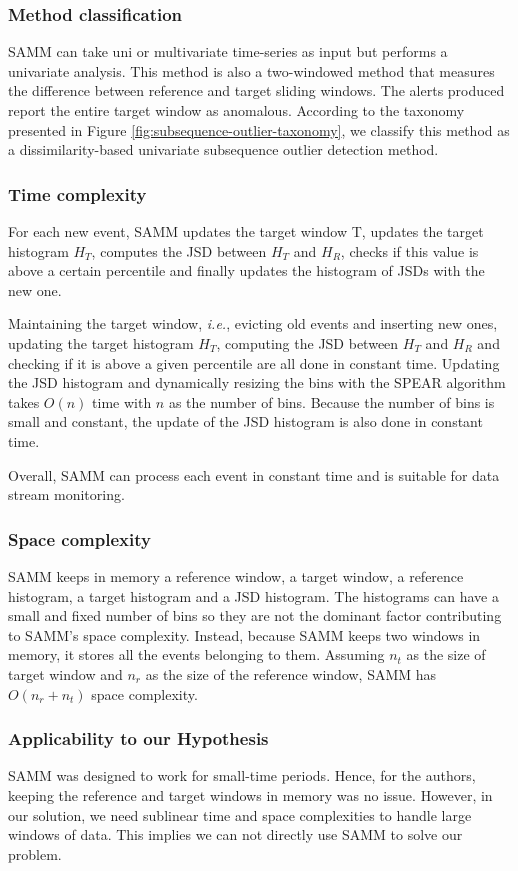 \subsubsection*{Method classification}
SAMM can take uni or multivariate time-series as input but performs a univariate analysis. This method is also a two-windowed method that measures the difference between reference and target sliding windows. The alerts produced report the entire target window as anomalous. According to the taxonomy presented in Figure \ref{fig:subsequence-outlier-taxonomy}, we classify this method as a dissimilarity-based univariate subsequence outlier detection method.

\subsubsection*{Time complexity}
For each new event, SAMM updates the target window T, updates the target histogram $H_T$, computes the JSD between $H_T$ and $H_R$, checks if this value is above a certain percentile and finally updates the histogram of JSDs with the new one. 

Maintaining the target window, \textit{i.e.}, evicting old events and inserting new ones, updating the target histogram $H_T$, computing the JSD between $H_T$ and $H_R$ and checking if it is above a given percentile are all done in constant time. Updating the JSD histogram and dynamically resizing the bins with the SPEAR algorithm takes $O(n)$ time with $n$ as the number of bins. Because the number of bins is small and constant, the update of the JSD histogram is also done in constant time.

Overall, SAMM can process each event in constant time and is suitable for data stream monitoring.

\subsubsection*{Space complexity}
SAMM keeps in memory a reference window, a target window, a reference histogram, a target histogram and a JSD histogram. The histograms can have a small and fixed number of bins so they are not the dominant factor contributing to SAMM's space complexity. Instead, because SAMM keeps two windows in memory, it stores all the events belonging to them. Assuming $n_t$ as the size of target window and $n_r$ as the size of the reference window, SAMM has $O(n_r + n_t)$ space complexity.

\subsubsection*{Applicability to our Hypothesis}
SAMM was designed to work for small-time periods. Hence, for the authors, keeping the reference and target windows in memory was no issue. However, in our solution, we need sublinear time and space complexities to handle large windows of data. This implies we can not directly use SAMM to solve our problem.

